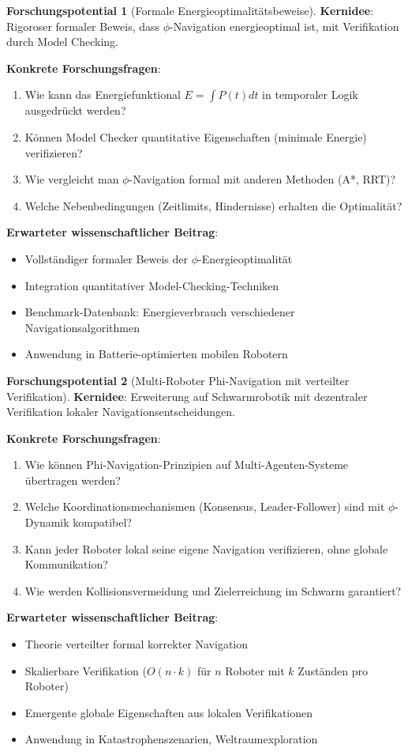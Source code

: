 ﻿\documentclass[a4paper,12pt]{article}
\theoremstyle{definition}
\newtheorem{potential}{Forschungspotential}[section]
\begin{document}
\begin{potential}[Formale Energieoptimalitätsbeweise]
\textbf{Kernidee}: Rigoroser formaler Beweis, dass $\phi$-Navigation energieoptimal ist, mit Verifikation durch Model Checking.

\textbf{Konkrete Forschungsfragen}:
\begin{enumerate}
	\item Wie kann das Energiefunktional $E = \int P(t) dt$ in temporaler Logik ausgedrückt werden?
	\item Können Model Checker quantitative Eigenschaften (minimale Energie) verifizieren?
	\item Wie vergleicht man $\phi$-Navigation formal mit anderen Methoden (A*, RRT)?
	\item Welche Nebenbedingungen (Zeitlimits, Hindernisse) erhalten die Optimalität?
\end{enumerate}

\textbf{Erwarteter wissenschaftlicher Beitrag}:
\begin{itemize}
	\item Vollständiger formaler Beweis der $\phi$-Energieoptimalität
	\item Integration quantitativer Model-Checking-Techniken
	\item Benchmark-Datenbank: Energieverbrauch verschiedener Navigationsalgorithmen
	\item Anwendung in Batterie-optimierten mobilen Robotern
\end{itemize}
\end{potential}

\begin{potential}[Multi-Roboter Phi-Navigation mit verteilter Verifikation]
\textbf{Kernidee}: Erweiterung auf Schwarmrobotik mit dezentraler Verifikation lokaler Navigationsentscheidungen.

\textbf{Konkrete Forschungsfragen}:
\begin{enumerate}
	\item Wie können Phi-Navigation-Prinzipien auf Multi-Agenten-Systeme übertragen werden?
	\item Welche Koordinationsmechanismen (Konsensus, Leader-Follower) sind mit $\phi$-Dynamik kompatibel?
	\item Kann jeder Roboter lokal seine eigene Navigation verifizieren, ohne globale Kommunikation?
	\item Wie werden Kollisionsvermeidung und Zielerreichung im Schwarm garantiert?
\end{enumerate}

\textbf{Erwarteter wissenschaftlicher Beitrag}:
\begin{itemize}
	\item Theorie verteilter formal korrekter Navigation
	\item Skalierbare Verifikation ($O(n \cdot k)$ für $n$ Roboter mit $k$ Zuständen pro Roboter)
	\item Emergente globale Eigenschaften aus lokalen Verifikationen
	\item Anwendung in Katastrophenszenarien, Weltraumexploration
\end{itemize}
\end{potential}
\end{document}
